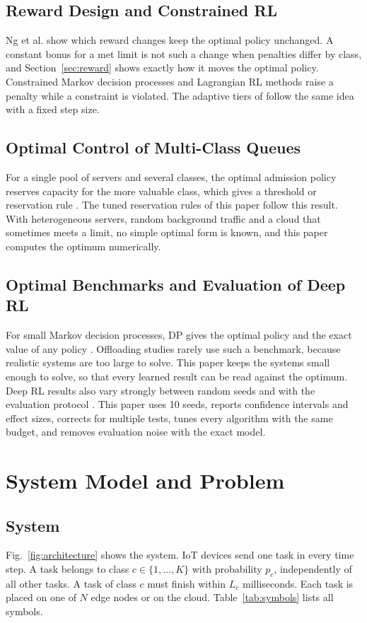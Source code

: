 \documentclass[journal]{IEEEtran}
\begin{document}
\subsection{Reward Design and Constrained RL}
Ng et al. \cite{ng1999} show which reward changes keep the optimal policy unchanged. A constant bonus for a met limit is not such a change when penalties differ by class, and Section~\ref{sec:reward} shows exactly how it moves the optimal policy. Constrained Markov decision processes \cite{altman1999} and Lagrangian RL methods \cite{tessler2019} raise a penalty while a constraint is violated. The adaptive tiers of \cite{yamsani2026} follow the same idea with a fixed step size.

\subsection{Optimal Control of Multi-Class Queues}
For a single pool of servers and several classes, the optimal admission policy reserves capacity for the more valuable class, which gives a threshold or reservation rule \cite{miller1969}. The tuned reservation rules of this paper follow this result. With heterogeneous servers, random background traffic and a cloud that sometimes meets a limit, no simple optimal form is known, and this paper computes the optimum numerically.

\subsection{Optimal Benchmarks and Evaluation of Deep RL}
For small Markov decision processes, DP gives the optimal policy and the exact value of any policy \cite{puterman1994,sutton2018}. Offloading studies rarely use such a benchmark, because realistic systems are too large to solve. This paper keeps the systems small enough to solve, so that every learned result can be read against the optimum. Deep RL results also vary strongly between random seeds and with the evaluation protocol \cite{henderson2018,agarwal2021}. This paper uses 10 seeds, reports confidence intervals and effect sizes, corrects for multiple tests, tunes every algorithm with the same budget, and removes evaluation noise with the exact model.

\section{System Model and Problem}
\label{sec:model}

\subsection{System}
Fig.~\ref{fig:architecture} shows the system. IoT devices send one task in every time step. A task belongs to class $c \in \{1,\dots,K\}$ with probability $p_c$, independently of all other tasks. A task of class $c$ must finish within $L_c$ milliseconds. Each task is placed on one of $N$ edge nodes or on the cloud. Table~\ref{tab:symbols} lists all symbols.
\end{document}
